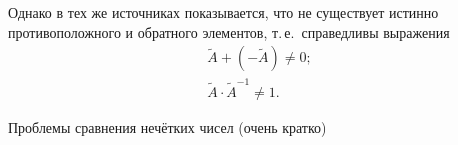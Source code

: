 Однако в тех же источниках показывается, что не существует истинно противоположного и обратного элементов, т.\,е.~справедливы выражения
\begin{gather}
	\label{eq:zadeh-zero-nonequality}
	\tilde{A}+\left( -\tilde{A} \right)\ne 0; \\
	\label{eq:zadeh-reverse-nonequality}
	\tilde{A}\cdot {{\tilde{A}}^{-1}}\ne 1.
\end{gather}

Проблемы сравнения нечётких чисел (очень кратко)
